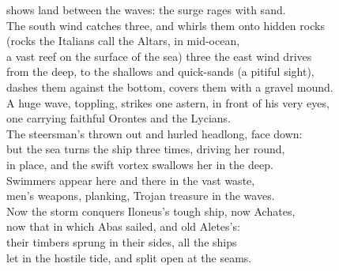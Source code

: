 \documentclass[12pt, a5paper, titlepage]{letter}
\begin{document}
shows land between the waves: the surge rages with sand.\\
The south wind catches three, and whirls them onto hidden rocks\\
(rocks the Italians call the Altars, in mid-ocean,\\
a vast reef on the surface of the sea) three the east wind drives\\
from the deep, to the shallows and quick-sands (a pitiful sight),\\
dashes them against the bottom, covers them with a gravel mound.\\
A huge wave, toppling, strikes one astern, in front of his very eyes,\\
one carrying faithful Orontes and the Lycians.\\
The steersman's thrown out and hurled headlong, face down:\\
but the sea turns the ship three times, driving her round,\\
in place, and the swift vortex swallows her in the deep.\\
Swimmers appear here and there in the vast waste,\\
men's weapons, planking, Trojan treasure in the waves.\\
Now the storm conquers Iloneus's tough ship, now Achates,\\
now that in which Abas sailed, and old Aletes's:\\
their timbers sprung in their sides, all the ships\\
let in the hostile tide, and split open at the seams.
\end{document}
